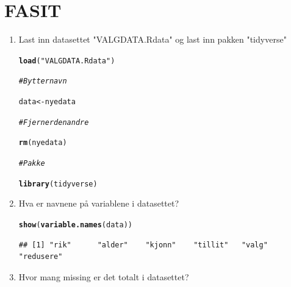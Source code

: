 \documentclass{article}\usepackage[]{graphicx}\usepackage[]{color}
\makeatletter
\newcommand{\hlstr}[1]{\textcolor[rgb]{0.192,0.494,0.8}{#1}}%
\newcommand{\hlcom}[1]{\textcolor[rgb]{0.678,0.584,0.686}{\textit{#1}}}%
\newcommand{\hlstd}[1]{\textcolor[rgb]{0.345,0.345,0.345}{#1}}%
\newcommand{\hlkwb}[1]{\textcolor[rgb]{0.69,0.353,0.396}{#1}}%
\newcommand{\hlkwd}[1]{\textcolor[rgb]{0.737,0.353,0.396}{\textbf{#1}}}%
\newenvironment{kframe}{%
 \def\at@end@of@kframe{}%
 \ifinner\ifhmode%
  \def\at@end@of@kframe{\end{minipage}}%
  \begin{minipage}{\columnwidth}%
 \fi\fi%
 \def\FrameCommand##1{\hskip\@totalleftmargin \hskip-\fboxsep
 \colorbox{shadecolor}{##1}\hskip-\fboxsep
     \hskip-\linewidth \hskip-\@totalleftmargin \hskip\columnwidth}%
 \MakeFramed {\advance\hsize-\width
   \@totalleftmargin\z@ \linewidth\hsize
   \@setminipage}}%
 {\par\unskip\endMakeFramed%
 \at@end@of@kframe}
\newenvironment{knitrout}{}{} %
\makeatother
\begin{document}
\newpage 
\section{FASIT}
\begin{enumerate}
\item Last inn datasettet "VALGDATA.Rdata" og last inn pakken "tidyverse"
\begin{knitrout}
\color{fgcolor}\begin{kframe}
\begin{alltt}
\hlkwd{load}\hlstd{(}\hlstr{"VALGDATA.Rdata"}\hlstd{)}

\hlcom{# Bytter navn}

\hlstd{data} \hlkwb{<-} \hlstd{nyedata}

\hlcom{# Fjerner den andre }

\hlkwd{rm}\hlstd{(nyedata)}

\hlcom{# Pakke }

\hlkwd{library}\hlstd{(tidyverse)}
\end{alltt}


{\ttfamily\noindent\itshape\color{messagecolor}{\#\# -- Attaching packages --------------------------------------- tidyverse 1.3.0 --}}

{\ttfamily\noindent\itshape\color{messagecolor}{\#\# v ggplot2 3.3.3\ \ \ \  v purrr\ \  0.3.4\\\#\# v tibble\ \ 3.0.6\ \ \ \  v dplyr\ \  1.0.3\\\#\# v tidyr\ \  1.1.2\ \ \ \  v stringr 1.4.0\\\#\# v readr\ \  1.4.0\ \ \ \  v forcats 0.5.0}}

{\ttfamily\noindent\itshape\color{messagecolor}{\#\# -- Conflicts ------------------------------------------ tidyverse\_conflicts() --\\\#\# x dplyr::filter() masks stats::filter()\\\#\# x dplyr::lag()\ \ \ \ masks stats::lag()}}\end{kframe}
\end{knitrout}

\item Hva er navnene på variablene i datasettet? 

\begin{knitrout}
\color{fgcolor}\begin{kframe}
\begin{alltt}
\hlkwd{show}\hlstd{(}\hlkwd{variable.names}\hlstd{(data))}
\end{alltt}
\begin{verbatim}
## [1] "rik"      "alder"    "kjonn"    "tillit"   "valg"     "redusere"
\end{verbatim}
\end{kframe}
\end{knitrout}
\item Hvor mang missing er det totalt i datasettet?


\end{enumerate}
\end{document}
